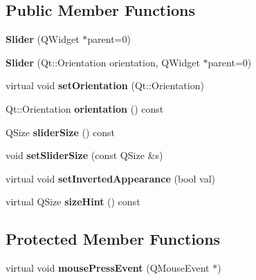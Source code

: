\subsection*{Public Member Functions}
\begin{DoxyCompactItemize}
\item 
\mbox{\label{class_awl_1_1_slider_a44016e254a3042b390cdfd415e8839fc}} 
{\bfseries Slider} (Q\+Widget $\ast$parent=0)
\item 
\mbox{\label{class_awl_1_1_slider_a1f129f82880519f0b9d6c91b0f338e98}} 
{\bfseries Slider} (Qt\+::\+Orientation orientation, Q\+Widget $\ast$parent=0)
\item 
\mbox{\label{class_awl_1_1_slider_affb03dd58206dc4e69eb0e392cb3eee7}} 
virtual void {\bfseries set\+Orientation} (Qt\+::\+Orientation)
\item 
\mbox{\label{class_awl_1_1_slider_a9f2399d2eeaf1946e30d31a81f2f06f0}} 
Qt\+::\+Orientation {\bfseries orientation} () const
\item 
\mbox{\label{class_awl_1_1_slider_a0dc0a1530ae3c0acdeb96b5ecd6b9cf1}} 
Q\+Size {\bfseries slider\+Size} () const
\item 
\mbox{\label{class_awl_1_1_slider_a94cf2aa99917be9dc0f5cb485b7bf4a3}} 
void {\bfseries set\+Slider\+Size} (const Q\+Size \&s)
\item 
\mbox{\label{class_awl_1_1_slider_ab716874e6496a221080582eea9c5a453}} 
virtual void {\bfseries set\+Inverted\+Appearance} (bool val)
\item 
\mbox{\label{class_awl_1_1_slider_aa942e4e53bfb6d71e732557e5679d0df}} 
virtual Q\+Size {\bfseries size\+Hint} () const
\end{DoxyCompactItemize}
\subsection*{Protected Member Functions}
\begin{DoxyCompactItemize}
\item 
\mbox{\label{class_awl_1_1_slider_a4823e6bb2d01a48e9a007d018e6185fc}} 
virtual void {\bfseries mouse\+Press\+Event} (Q\+Mouse\+Event $\ast$)
\end{DoxyCompactItemize}
